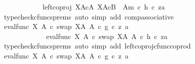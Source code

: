\begin{isabellebody}
\ \ \ \ \ \ \ \ \ \ \ \ left{\isacharunderscore}{\kern0pt}coproj\ {\isacharparenleft}{\kern0pt}X\isactrlbsup A\isactrlesup {\isasymtimes}\isactrlsub cA{\isacharparenright}{\kern0pt}\ {\isacharparenleft}{\kern0pt}X\isactrlbsup A\isactrlesup {\isasymtimes}\isactrlsub c{\isacharparenleft}{\kern0pt}B\ {\isasymsetminus}\ {\isacharparenleft}{\kern0pt}A{\isacharcomma}{\kern0pt}m{\isacharparenright}{\kern0pt}{\isacharparenright}{\kern0pt}{\isacharparenright}{\kern0pt}{\isacharparenright}{\kern0pt}\ {\isasymcirc}\isactrlsub c\ {\isasymlangle}h\ {\isasymcirc}\isactrlsub c\ z{\isacharcomma}{\kern0pt}a{\isasymrangle}{\isachardoublequoteclose}\isanewline
\ \ \ \ \ \ \ \ \ \ \ \ \isamarkupfalse%
\ {\isacharparenleft}{\kern0pt}typecheck{\isacharunderscore}{\kern0pt}cfuncs{\isacharunderscore}{\kern0pt}prems{\isacharcomma}{\kern0pt}\ auto\ simp\ add{\isacharcolon}{\kern0pt}\ comp{\isacharunderscore}{\kern0pt}associative{}{\isacharparenright}{\kern0pt}\isanewline
\ \ \ \ \ \ \ \ \ \ \isamarkupfalse%
\ \isamarkupfalse%
\ {\isachardoublequoteopen}{\isacharparenleft}{\kern0pt}eval{\isacharunderscore}{\kern0pt}func\ X\ A\ {\isasymcirc}\isactrlsub c\ swap\ {\isacharparenleft}{\kern0pt}X\isactrlbsup A\isactrlesup {\isacharparenright}{\kern0pt}\ A{\isacharparenright}{\kern0pt}\ {\isasymcirc}\isactrlsub c\ {\isasymlangle}g\ {\isasymcirc}\isactrlsub c\ z{\isacharcomma}{\kern0pt}\ a{\isasymrangle}\isanewline
\ \ \ \ \ \ \ \ \ \ \ \ {\isacharequal}{\kern0pt}\ {\isacharparenleft}{\kern0pt}eval{\isacharunderscore}{\kern0pt}func\ X\ A\ {\isasymcirc}\isactrlsub c\ swap\ {\isacharparenleft}{\kern0pt}X\isactrlbsup A\isactrlesup {\isacharparenright}{\kern0pt}\ A{\isacharparenright}{\kern0pt}\ {\isasymcirc}\isactrlsub c\ {\isasymlangle}h\ {\isasymcirc}\isactrlsub c\ z{\isacharcomma}{\kern0pt}a{\isasymrangle}{\isachardoublequoteclose}\isanewline
\ \ \ \ \ \ \ \ \ \ \ \ \isamarkupfalse%
\ {\isacharparenleft}{\kern0pt}typecheck{\isacharunderscore}{\kern0pt}cfuncs{\isacharunderscore}{\kern0pt}prems{\isacharcomma}{\kern0pt}\ auto\ simp\ add{\isacharcolon}{\kern0pt}\ left{\isacharunderscore}{\kern0pt}coproj{\isacharunderscore}{\kern0pt}cfunc{\isacharunderscore}{\kern0pt}coprod{\isacharparenright}{\kern0pt}\isanewline
\ \ \ \ \ \ \ \ \ \ \isamarkupfalse%
\ \isamarkupfalse%
\ {\isachardoublequoteopen}eval{\isacharunderscore}{\kern0pt}func\ X\ A\ {\isasymcirc}\isactrlsub c\ swap\ {\isacharparenleft}{\kern0pt}X\isactrlbsup A\isactrlesup {\isacharparenright}{\kern0pt}\ A\ {\isasymcirc}\isactrlsub c\ {\isasymlangle}g\ {\isasymcirc}\isactrlsub c\ z{\isacharcomma}{\kern0pt}\ a{\isasymrangle}\isanewline

\end{isabellebody}
